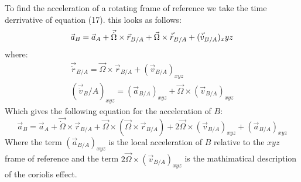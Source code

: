 \documentclass[11pt, a4paper]{article}
\begin{document}
To find the acceleration of a rotating frame of reference we take the time derrivative of equation (17). this looks as follows:
\begin{equation}
  \vec{a}_B = \vec{a}_A + \vec{\dot{\Omega}} \times \vec{r}_{B/A} + \vec{\Omega} \times \vec{\dot{r}}_{B/A} + (\vec{\dot{v}}_{B/A})_xyz\\
\end{equation}
where:
\begin{gather*}
  \vec{\dot{r}}_{B/A} = \vec{\Omega} \times \vec{r}_{B/A} + (\vec{v}_{B/A})_{xyz}\\
  (\vec{\dot{v}}_B/A)_{xyz} = (\vec{a}_{B/A})_{xyz} + \vec{\Omega} \times (\vec{v}_{B/A})_{xyz}
\end{gather*}
Which gives the following equation for the acceleration of $B$:
\begin{equation}
  \vec{a}_B = \vec{a}_A + \vec{\dot{\Omega}} \times \vec{r}_{B/A} + \vec{\Omega} \times (\vec{\Omega} \times \vec{r}_{B/A}) + 2\vec{\Omega} \times (\vec{v}_{B/A})_{xyz} + (\vec{a}_{B/A})_{xyz}
\end{equation}
Where the term $(\vec{a}_{B/A})_{xyz}$ is the local acceleration of $B$ relative to the $xyz$ frame of reference and the term $2\vec{\Omega} \times (\vec{v}_{B/A})_{xyz}$ is the mathimatical description of the coriolis effect.
\end{document}
